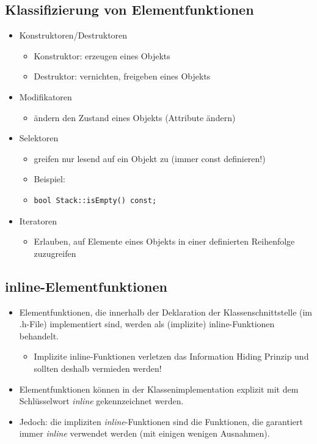 \subsection{Klassifizierung von Elementfunktionen}
\begin{itemize}
	\item Konstruktoren/Destruktoren
	\begin{itemize}
		\item Konstruktor: erzeugen eines Objekts
		\item Destruktor: vernichten, freigeben eines Objekts
	\end{itemize}
	\item Modifikatoren
	\begin{itemize}
		\item ändern den Zustand eines Objekts (Attribute ändern)
	\end{itemize}
	\item Selektoren
	\begin{itemize}
		\item greifen nur lesend auf ein Objekt zu (immer const definieren!)
		\item Beispiel:
		\item[\-] \vspace{-\baselineskip} \begin{minipage}{0.4\linewidth}
\begin{lstlisting}
bool Stack::isEmpty() const;
\end{lstlisting}
	\end{minipage}
	\end{itemize}
	\item Iteratoren
	\begin{itemize}
		\item Erlauben, auf Elemente eines Objekts in einer definierten Reihenfolge zuzugreifen
	\end{itemize}
\end{itemize}

\subsection{inline-Elementfunktionen}
\begin{itemize}
	\item Elementfunktionen, die innerhalb der Deklaration der Klassenschnittstelle (im .h-File) implementiert sind, werden als (implizite) inline-Funktionen behandelt.
	\begin{itemize}
		\item Implizite inline-Funktionen verletzen das Information Hiding Prinzip und sollten deshalb vermieden werden!
	\end{itemize}
	\item Elementfunktionen können in der Klassenimplementation explizit mit dem Schlüsselwort \emph{inline} gekennzeichnet werden.
	\item Jedoch: die impliziten \emph{inline}-Funktionen sind die Funktionen, die garantiert immer \emph{inline} verwendet werden (mit einigen wenigen Ausnahmen).
\end{itemize}

